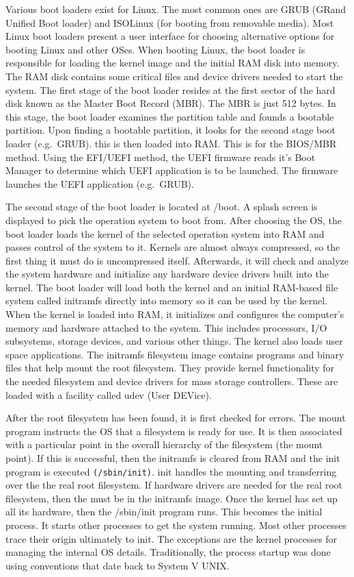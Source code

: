 Various boot loaders exist for Linux. The most common ones are GRUB
(GRand Unified Boot loader) and ISOLinux (for booting from removable
media). Most Linux boot loaders present a user interface for choosing
alternative options for booting Linux and other OSes. When booting
Linux, the boot loader is responsible for loading the kernel image and
the initial RAM disk into memory. The RAM disk contains some critical
files and device drivers needed to start the system. The first stage of
the boot loader resides at the first sector of the hard disk known as
the Master Boot Record (MBR). The MBR is just 512 bytes. In this stage,
the boot loader examines the partition table and founds a bootable
partition. Upon finding a bootable partition, it looks for the second
stage boot loader (e.g.~GRUB). this is then loaded into RAM. This is for
the BIOS/MBR method. Using the EFI/UEFI method, the UEFI firmware reads
it's Boot Manager to determine which UEFI application is to be launched.
The firmware launches the UEFI application (e.g.~GRUB).

The second stage of the boot loader is located at /boot. A splash screen
is displayed to pick the operation system to boot from. After choosing
the OS, the boot loader loads the kernel of the selected operation
system into RAM and passes control of the system to it. Kernels are
almost always compressed, so the first thing it must do is uncompressed
itself. Afterwards, it will check and analyze the system hardware and
initialize any hardware device drivers built into the kernel. The boot
loader will load both the kernel and an initial RAM-based file system
called initramfs directly into memory so it can be used by the kernel.
When the kernel is loaded into RAM, it initializes and configures the
computer's memory and hardware attached to the system. This includes
processors, I/O subsystems, storage devices, and various other things.
The kernel also loads user space applications. The initramfs filesystem
image contains programs and binary files that help mount the root
filesystem. They provide kernel functionality for the needed filesystem
and device drivers for mass storage controllers. These are loaded with a
facility called udev (User DEVice).

After the root filesystem has been found, it is first checked for
errors. The mount program instructs the OS that a filesystem is ready
for use. It is then associated with a particular point in the overall
hierarchy of the filesystem (the mount point). If this is successful,
then the initramfs is cleared from RAM and the init program is executed
\texttt{(/sbin/init)}. init handles the mounting and transferring over
the the real root filesystem. If hardware drivers are needed for the
real root filesystem, then the must be in the initramfs image. Once the
kernel has set up all its hardware, then the /sbin/init program runs.
This becomes the initial process. It starts other processes to get the
system running. Most other processes trace their origin ultimately to
init. The exceptions are the kernel processes for managing the internal
OS details. Traditionally, the process startup was done using
conventions that date back to System V UNIX.


